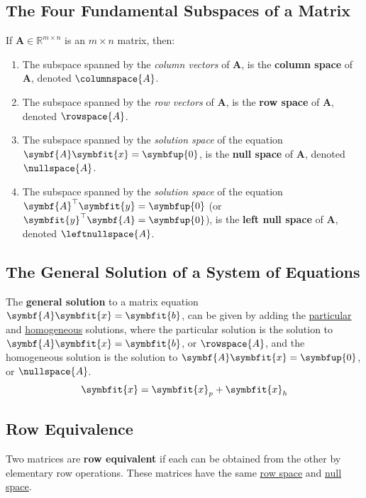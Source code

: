 \documentclass{article}
\begin{document}
\subsection{The Four Fundamental Subspaces of a Matrix}
\begin{definition}
    If \(\symbf{A}\in\mathbb{R}^{m \times n}\) is an \(m \times n\) matrix, then:
    \begin{enumerate}
        \item The subspace spanned by the \textit{column vectors} of
              \(\symbf{A}\), is the \textbf{column space} of
              \(\symbf{A}\), denoted \(\columnspace{A}\).
        \item The subspace spanned by the \textit{row vectors} of
              \(\symbf{A}\), is the \textbf{row space} of \(\symbf{A}\),
              denoted \(\rowspace{A}\).
        \item The subspace spanned by the \textit{solution space} of the
              equation \(\symbf{A}\symbfit{x}=\symbfup{0}\), is the
              \textbf{null space} of \(\symbf{A}\), denoted
              \(\nullspace{A}\).
        \item The subspace spanned by the \textit{solution space} of the
              equation \(\symbf{A}^{\top}\symbfit{y}=\symbfup{0}\)
              (or \(\symbfit{y}^{\top}\symbf{A}=\symbfup{0}\)), is the
              \textbf{left null space} of \(\symbf{A}\), denoted
              \(\leftnullspace{A}\).
    \end{enumerate}
\end{definition}
\subsection{The General Solution of a System of Equations}
\begin{theorem}
    The \textbf{general solution} to a matrix equation
    \(\symbf{A}\symbfit{x}=\symbfit{b}\), can be given by adding the
    \underline{particular} and \underline{homogeneous} solutions, where
    the particular solution is the solution to
    \(\symbf{A}\symbfit{x}=\symbfit{b}\), or \(\rowspace{A}\), and the
    homogeneous solution is the solution to
    \(\symbf{A}\symbfit{x}=\symbfup{0}\), or \(\nullspace{A}\).
    \begin{equation*}
        \symbfit{x} = \symbfit{x}_p + \symbfit{x}_h
    \end{equation*}
\end{theorem}
\subsection{Row Equivalence}
\begin{definition}
    Two matrices are \textbf{row equivalent} if each can be obtained
    from the other by elementary row operations. These matrices have the
    same \underline{row space} and \underline{null space}.
\end{definition}
\end{document}
